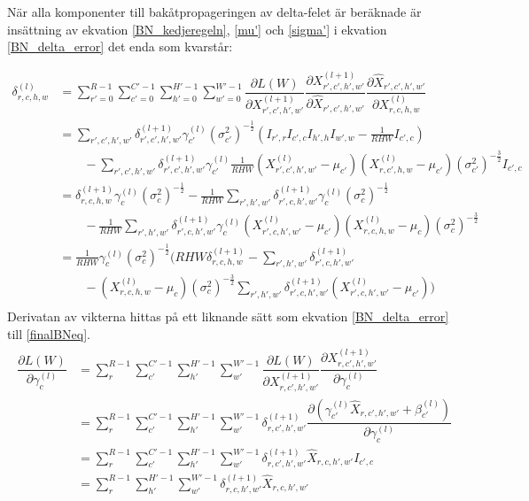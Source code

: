 \documentclass[a4paper,11pt,twoside]{article}
\newcommand*{\pd}[2]{\ensuremath{\dfrac{\partial #1}{\partial #2}}}
\begin{document}
När alla komponenter till bakåtpropageringen av delta-felet är beräknade är insättning av ekvation \eqref{BN_kedjeregeln}, \eqref{mu'} och \eqref{sigma'} i ekvation \eqref{BN_delta_error} det enda som kvarstår:

\begin{equation}\label{finalBNeq}
\begin{split}
	\delta^{(l)}_{r,c,h,w} 
	& = \sum^{R-1}_{r'=0} \sum^{C'-1}_{c'=0} \sum^{H'-1}_{h'=0} \sum^{W'-1}_{w'=0} \pd{L(W)}{X^{(l+1)}_{r',c',h',w'}} \pd{X^{(l+1)}_{r',c',h',w'}}{\hat{X}_{r',c',h',w'}} \pd{\hat{X}_{r',c',h',w'}}{{X}^{(l)}_{r,c,h,w}}\\
	& = \sum\limits_{r',c',h',w'}\delta^{(l+1)}_{r',c',h',w'} \gamma^{(l)}_{c'} {(\sigma^2_{c'})}^{-\frac{1}{2}} (I_{r',r} I_{c',c} I_{h',h} I_{w',w} - \frac{1}{RHW} I_{c',c}) \\
	& \qquad -\sum\limits_{r',c',h',w'}\delta^{(l+1)}_{r',c',h',w'} \gamma^{(l)}_{c'} \frac{1}{RHW} ({X^{(l)}_{r',c',h',w'} - \mu_{c'}})({X^{(l)}_{r,c',h,w} - \mu_{c'}}) {(\sigma^2_{c'})}^{-\frac{3}{2}} I_{c',c} \\
	& = \delta^{(l+1)}_{r,c,h,w} \gamma^{(l)}_{c} {(\sigma^2_{c})}^{-\frac{1}{2}} - \frac{1}{RHW} \sum\limits_{r',h',w'} \delta^{(l+1)}_{r',c,h',w'} \gamma^{(l)}_{c} {(\sigma^2_{c})}^{-\frac{1}{2}}\\
	& \qquad - \frac{1}{RHW} \sum\limits_{r',h',w'} \delta^{(l+1)}_{r',c,h',w'}\gamma^{(l)}_{c} ({X^{(l)}_{r',c,h',w'} - \mu_{c'}})({X^{(l)}_{r,c,h,w} - \mu_{c}}){(\sigma^2_{c})}^{-\frac{3}{2}} \\
	& = \frac{1}{RHW} \gamma^{(l)}_c {(\sigma^2_{c})}^{-\frac{1}{2}} \biggl(    RHW \delta^{(l+1)}_{r,c,h,w} -  \sum\limits_{r',h',w'} \delta^{(l+1)}_{r',c,h',w'} \qquad \\
	& \qquad -  ({X^{(l)}_{r,c,h,w} - \mu_{c}}) {(\sigma^2_{c})}^{-\frac{3}{2}} \sum\limits_{r',h',w'} \delta^{(l+1)}_{r',c,h',w'} ({X^{(l)}_{r',c,h',w'} - \mu_{c'}}) \biggl) \\
\end{split}
\end{equation}
Derivatan av vikterna hittas på ett liknande sätt som ekvation \eqref{BN_delta_error} till \eqref{finalBNeq}. \cite{webBN1} \cite{webBN2}
\begin{align}
\begin{split}
	\pd{L(W)}{\gamma^{(l)}_{c}}
		& = \sum^{R-1}_{r} \sum^{C'-1}_{c'} \sum^{H'-1}_{h'} \sum^{W'-1}_{w'} \pd{L(W)}{X^{(l+1)}_{r,c',h',w'}} \pd{X^{(l+1)}_{r,c',h',w'}}{\gamma^{(l)}_{c}} \\
		& = \sum^{R-1}_{r} \sum^{C'-1}_{c'} \sum^{H'-1}_{h'} \sum^{W'-1}_{w'} \delta^{(l+1)}_{r,c',h',w'}  \pd{({\gamma_{c'}^{(l)} \hat{X}_{r,c',h',w'} + \beta_{c'}^{(l)}})}{\gamma^{(l)}_{c}} \\
		& = \sum^{R-1}_{r} \sum^{C'-1}_{c'} \sum^{H'-1}_{h'} \sum^{W'-1}_{w'} \delta^{(l+1)}_{r,c',h',w'} \hat{X}_{r,c,h',w'} I_{c',c}\\
		& = \sum^{R-1}_{r} \sum^{H'-1}_{h'} \sum^{W'-1}_{w'} \delta^{(l+1)}_{r,c,h',w'} \hat{X}_{r,c,h',w'} \\
\end{split}
\end{align}
\end{document}
